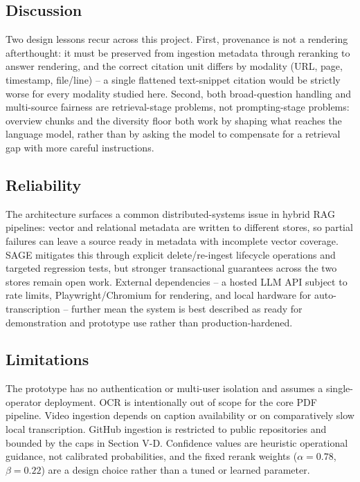 \documentclass[conference]{IEEEtran}
\begin{document}
\subsection{Discussion}
Two design lessons recur across this project. First, provenance is not
a rendering afterthought: it must be preserved from ingestion metadata
through reranking to answer rendering, and the correct citation unit
differs by modality (URL, page, timestamp, file/line) -- a single
flattened text-snippet citation would be strictly worse for every
modality studied here. Second, both broad-question handling and
multi-source fairness are retrieval-stage problems, not
prompting-stage problems: overview chunks and the diversity floor both
work by shaping what reaches the language model, rather than by asking
the model to compensate for a retrieval gap with more careful
instructions.

\subsection{Reliability}
The architecture surfaces a common distributed-systems issue in hybrid
RAG pipelines: vector and relational metadata are written to different
stores, so partial failures can leave a source ready in metadata with
incomplete vector coverage. SAGE mitigates this through explicit
delete/re-ingest lifecycle operations and targeted regression tests, but
stronger transactional guarantees across the two stores remain open
work. External dependencies -- a hosted LLM API subject to rate limits,
Playwright/Chromium for rendering, and local hardware for
auto-transcription -- further mean the system is best described as ready
for demonstration and prototype use rather than production-hardened.

\subsection{Limitations}
The prototype has no authentication or multi-user isolation and assumes
a single-operator deployment. OCR is intentionally out of scope for the
core PDF pipeline. Video ingestion depends on caption availability or
on comparatively slow local transcription. GitHub ingestion is
restricted to public repositories and bounded by the caps in Section
V-D. Confidence values are heuristic operational guidance, not
calibrated probabilities, and the fixed rerank weights ($\alpha=0.78$,
$\beta=0.22$) are a design choice rather than a tuned or learned
parameter.
\end{document}
